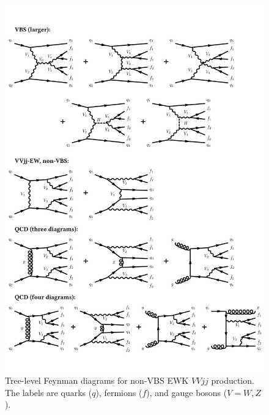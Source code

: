 \begin{figure}[htbp]
  \centering
  \includegraphics[width=.54\textwidth]{figs/ssww_13tev/diagrams/NoVbsEW}
  \caption{Tree-level Feynman diagrams for non-VBS EWK $VVjj$ production.  The labels are quarks ($q$), fermions ($f$), and gauge bosons ($V = W,Z$). }
  \label{fig:ssww13tev_diagrams_ewk}
\end{figure}

